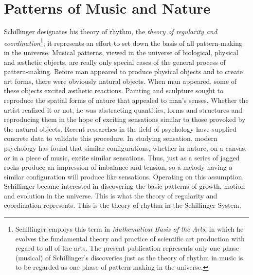 \section{Patterns of Music and Nature}


Schillinger designates his theory of rhythm, the \textit{theory of regularity
and coordination}\footnote{Schillinger employs this term in
\textit{Mathematical Basis of the Arts}, in which he evolves the fundamental
theory and practice of scientific art production with regard to all of the
arts. The present publication represents only one phase (musical) of
Schillinger's discoveries just as the theory of rhythm in music is to be
regarded as one phase of pattern-making in the universe.}; it represents an
effort to set down the basis of all pattern-making in the universe. Musical
patterns, viewed in the universe of biological, physical and \ae sthetic objects,
are really only special cases of the general process of pattern-making. Before
man appeared to produce physical objects and to create art forms, there were
obviously natural objects. When man appeared, some of these objects excited
\ae sthetic reactions. Painting and sculpture sought to reproduce the spatial
forms of nature that appealed to man's senses. Whether the artist realized it
or not, he was abstracting quantities, forms and structures and reproducing
them in the hope of exciting sensations similar to those provoked by the
natural objects. Recent researches in the field of psychology have supplied
concrete data to validate this procedure. In studying sensation, modern
psychology has found that similar configurations, whether in nature, on a
canvas, or in a piece of music, excite similar sensations. Thus, just as a
series of jagged rocks produce an impression of imbalance and tension, so a
melody having a similar configuration will produce like sensations. Operating
on this assumption, Schillinger became interested in discovering the basic
patterns of growth, motion and evolution in the universe. This is what the
theory of regularity and coordination represents. This is the theory of rhythm
in the Schillinger System.

